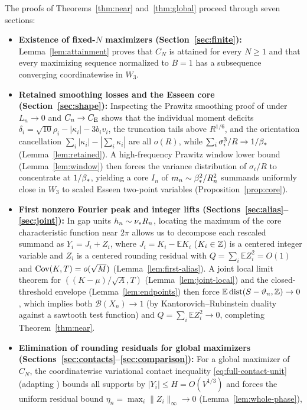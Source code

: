 \documentclass[11pt]{article}
\numberwithin{equation}{section}
\theoremstyle{remark}\newtheorem{remark}[theorem]{Remark}
\newcommand{\E}{\mathbb E}\newcommand{\Pp}{\mathbb P}
\begin{document}
The proofs of Theorems~\ref{thm:near} and~\ref{thm:global} proceed through
seven sections:
\begin{itemize}[leftmargin=2em]
\item \textbf{Existence of fixed-$N$ maximizers (Section~\ref{sec:finite}):}
Lemma~\ref{lem:attainment} proves that $C_N$ is attained for every $N\ge1$
and that every maximizing sequence normalized to $B=1$ has a subsequence
converging coordinatewise in $W_3$.
\item \textbf{Retained smoothing losses and the Esseen core
(Section~\ref{sec:shape}):} Inspecting the Prawitz smoothing proof of
\citet[pp.~289--303]{Shevtsova2012} under $L_n\to0$ and $C_n\to C_{\mathrm E}$ shows that
the individual moment deficits $\delta_i=\sqrt{10}\rho_i-|\kappa_i|-3b_iv_i$,
the truncation tails above $R^{1/6}$, and the orientation cancellation
$\sum_i|\kappa_i|-|\sum_i\kappa_i|$ are all $o(R)$, while
$\sum_i\sigma_i^3/R\to1/\beta_*$ (Lemma~\ref{lem:retained}). A high-frequency
Prawitz window lower bound (Lemma~\ref{lem:window}) then forces the variance
distribution of $\sigma_i/R$ to concentrate at $1/\beta_*$, yielding a core $I_n$
of $m_n\sim\beta_*^2/R_n^2$ summands uniformly close in $W_3$ to scaled Esseen
two-point variables (Proposition~\ref{prop:core}).
\item \textbf{First nonzero Fourier peak and integer lifts
(Sections~\ref{sec:alias}--\ref{sec:joint}):} In gap units $h_n\sim\nu_* R_n$,
locating the maximum of the core characteristic function near $2\pi$ allows
us to decompose each rescaled summand as $Y_i=J_i+Z_i$, where $J_i=K_i-\E K_i$
($K_i\in\mathbb Z$) is a centered integer variable and $Z_i$ is a centered rounding
residual with $Q=\sum_i\E Z_i^2=O(1)$ and $\operatorname{Cov}(K,T)=o(\sqrt M)$
(Lemma~\ref{lem:first-alias}). A joint local limit theorem for
$((K-\mu)/\sqrt A,T)$ (Lemma~\ref{lem:joint-local}) and the closed-threshold
envelope (Lemma~\ref{lem:endpoints}) then force $\E\dist(S-\vartheta_n,\Z)\to0$,
which implies both $\mathcal B(X_n)\to1$ (by Kantorovich--Rubinstein duality
against a sawtooth test function) and $Q=\sum_i\E Z_i^2\to0$, completing
Theorem~\ref{thm:near}.
\item \textbf{Elimination of rounding residuals for global maximizers
(Sections~\ref{sec:contacts}--\ref{sec:comparison}):} For a global maximizer
of $C_N$, the coordinatewise variational contact inequality
\eqref{eq:full-contact-unit} (adapting \citet[Section~2.1]{HeChengCurrent2026})
bounds all supports by $|Y_i|\le H=O(V^{1/3})$ and forces the uniform
residual bound $\eta_n=\max_i\|Z_i\|_\infty\to0$ (Lemma~\ref{lem:whole-phase}),

\end{itemize}
\end{document}

